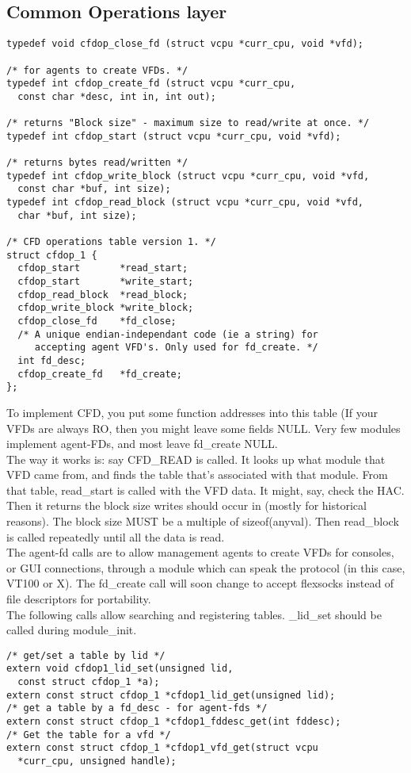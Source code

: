 \documentclass[a4paper,oneside,openany]{book}
\begin{document}
\subsection{Common Operations layer}
\begin{verbatim}
typedef void cfdop_close_fd (struct vcpu *curr_cpu, void *vfd);

/* for agents to create VFDs. */
typedef int cfdop_create_fd (struct vcpu *curr_cpu,
  const char *desc, int in, int out);

/* returns "Block size" - maximum size to read/write at once. */
typedef int cfdop_start (struct vcpu *curr_cpu, void *vfd);

/* returns bytes read/written */
typedef int cfdop_write_block (struct vcpu *curr_cpu, void *vfd,
  const char *buf, int size);
typedef int cfdop_read_block (struct vcpu *curr_cpu, void *vfd,
  char *buf, int size);

/* CFD operations table version 1. */
struct cfdop_1 {
  cfdop_start       *read_start;
  cfdop_start       *write_start;
  cfdop_read_block  *read_block;
  cfdop_write_block *write_block;
  cfdop_close_fd    *fd_close;
  /* A unique endian-independant code (ie a string) for
     accepting agent VFD's. Only used for fd_create. */
  int fd_desc;
  cfdop_create_fd   *fd_create;
};
\end{verbatim}
To implement CFD, you put some function addresses into this table (If your
VFDs are always RO, then you might leave some fields NULL. Very few modules
implement agent-FDs, and most leave fd\_create NULL.
\smallskip\\
The way it works is: say CFD\_READ is called. It looks up what module that
VFD came from, and finds the table that's associated with that module. From
that table, read\_start is called with the VFD data. It might, say, check the
HAC. Then it returns the block size writes should occur in (mostly for
historical reasons). The block size MUST be a multiple of sizeof(anyval).
Then read\_block is called repeatedly until all the data is read.
\smallskip\\
The agent-fd calls are to allow management agents to create VFDs for consoles,
or GUI connections, through a module which can speak the protocol (in this case,
VT100 or X). The fd\_create call will soon change to accept flexsocks instead
of file descriptors for portability.
\smallskip\\
The following calls allow searching and registering tables. \_lid\_set should
be called during module\_init.
\begin{verbatim}
/* get/set a table by lid */
extern void cfdop1_lid_set(unsigned lid,
  const struct cfdop_1 *a);
extern const struct cfdop_1 *cfdop1_lid_get(unsigned lid);
/* get a table by a fd_desc - for agent-fds */
extern const struct cfdop_1 *cfdop1_fddesc_get(int fddesc);
/* Get the table for a vfd */
extern const struct cfdop_1 *cfdop1_vfd_get(struct vcpu 
  *curr_cpu, unsigned handle);
\end{verbatim}
\end{document}
